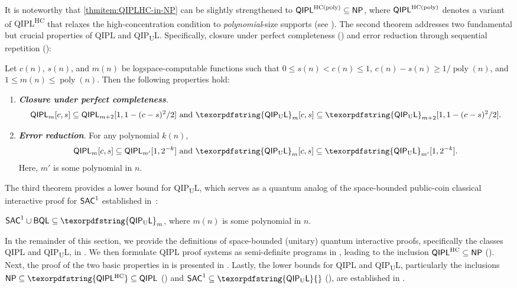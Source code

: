 \documentclass[10pt,a4paper]{article}
\numberwithin{equation}{section}
\numberwithin{figure}{section}
\newcommand{\NP}{\textnormal{\textsf{NP}}\xspace}
\newcommand{\QIPL}{\textnormal{\textsf{QIPL}}\xspace}
\newcommand{\QIPUL}{\texorpdfstring{\textnormal{\textsf{QIP}\textsubscript{\textnormal{U}}\textsf{L}}}\xspace}
\newcommand{\QIPLHC}{\texorpdfstring{\textnormal{\textsf{QIPL}\textsuperscript{\textnormal{HC}}}}\xspace}
\newcommand{\HC}{\mathrm{HC}}
\newcommand{\BQL}{\textnormal{\textsf{BQL}}\xspace}
\newcommand{\SAC}{\textnormal{\textsf{SAC}}\xspace}
\DeclareMathOperator\poly{poly}
\begin{document}
It is noteworthy that \ref{thmitem:QIPLHC-in-NP} can be slightly strengthened to $\QIPL^{\HC(\poly)} \subseteq \NP$, where $\QIPL^{\HC(\poly)}$ denotes a variant of \QIPLHC{} that relaxes the high-concentration condition to \textit{polynomial}-size supports (see ).
The second theorem addresses two fundamental but crucial properties of \QIPL{} and \QIPUL{}. Specifically, closure under perfect completeness () and error reduction through sequential repetition (): 

\begin{theorem}[Basic properties for \QIPL{} and \QIPUL{}]
    \label{thm:QIPL-basic-properties}
    Let $c(n)$, $s(n)$, and $m(n)$ be logspace-computable functions such that $0 \leq s(n) < c(n) \leq 1$, $c(n) - s(n) \geq 1/\poly(n)$, and $1 \leq m(n) \leq \poly(n)$. Then the following properties hold:
    \begin{enumerate}[label={\upshape(\arabic*)}, topsep=0.33em, itemsep=0.33em, parsep=0.33em]
        \item \textbf{\emph{Closure under perfect completeness}}.         \label{thmitem:QIPL-perfect-completeness}
        \[ \QIPL_m[c,s] \subseteq \QIPL_{m+2}[1,1-(c-s)^2/2] \text{ and } \QIPUL_m[c,s] \subseteq \QIPUL_{m+2}[1,1-(c-s)^2/2]. \]
        \item \textbf{\emph{Error reduction}}. For any polynomial $k(n)$, 
        \[ \QIPL_m[c,s] \subseteq \QIPL_{m'}[1,2^{-k}] \text{ and } \QIPUL_m[c,s] \subseteq \QIPUL_{m'}[1,2^{-k}]. \]
        Here, $m'$ is some polynomial in $n$. \label{thmitem:QIPL-error-reduction}
    \end{enumerate}
\end{theorem}

The third theorem provides a lower bound for \QIPUL{}, which serves as a quantum analog of the space-bounded public-coin classical interactive proof for $\SAC^1$ established in~\cite{Fortnow89}: 
\begin{theorem}
    \label{thm:LOGCFL-in-QIPUL}
    $\SAC^1 \cup \BQL \subseteq \QIPUL_m$, where $m(n)$ is some polynomial in $n$.
\end{theorem}

\vspace{1em}
In the remainder of this section, we provide the definitions of space-bounded (unitary) quantum interactive proofs, specifically the classes \QIPL{} and \QIPUL{}, in . 
We then formulate \QIPL{} proof systems as semi-definite programs in , leading to the inclusion $\QIPL^\HC \subseteq \NP$ (). 
Next, the proof of the two basic properties in  is presented in . 
Lastly, the lower bounds for \QIPL{} and \QIPUL{}, particularly the inclusions $\NP \subseteq \QIPLHC \subseteq \QIPL$ () and $\SAC^1 \subseteq \QIPUL{}$ (), are established in . 
\end{document}
